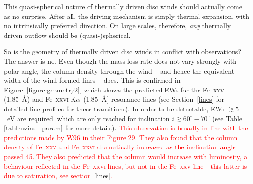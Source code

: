 \documentclass[a4paper,fleqn,usenatbib]{mnras}
\begin{document}
This quasi-spherical nature of thermally driven disc winds should
actually come as no surprise. After all, the driving mechanism is
simply thermal expansion, with no intrinsically preferred
direction. On large scales, therefore, {\em any} thermally driven
outflow should be (quasi-)spherical.

So is the geometry of thermally driven disc winds in conflict with
observations? The answer is no. Even though the mass-loss rate
does not vary strongly with polar angle, the column density
through the wind -- and hence the equivalent width of the
wind-formed lines -- does. This is confirmed in
Figure~\ref{figure:geometry2}, which shows the predicted EWs for the
Fe~\textsc{xxv} (1.85~{\AA}) and Fe~\textsc{xxvi} K$\rm{\alpha}$
(1.85~{\AA}) resonance lines (see Section~\ref{lines} for detailed
line profiles for these transitions). In order to be detectable, EWs
$\gtrsim 5$~eV are required, which are only reached for inclination
$i \gtrsim 60^\circ - 70^\circ$ (see Table \ref{table:wind_param} for
more details). \textcolor{red}{This observation is broadly in line with 
the predictions made by W96 in their Figure
29. They also found that
the column density of Fe~\textsc{xxv} and Fe~\textsc{xxvi} dramatically 
increased as the inclination angle passed 45\degree. They also predicted
that the column would increase with luminosity, a behaviour reflected
in the Fe~\textsc{xxvi} lines, but not in the Fe~\textsc{xxv} line - this
latter is due to saturation, see section \ref{lines}.} 
\end{document}
